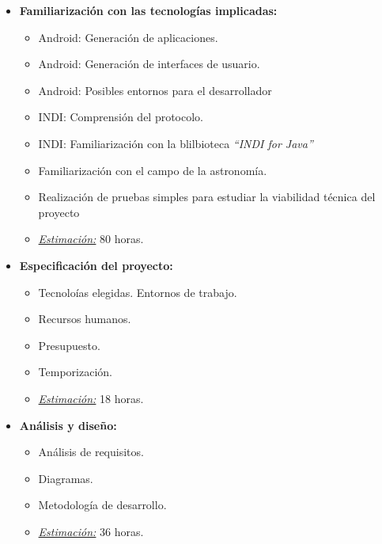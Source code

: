 \begin{itemize}
   \item \textbf{Familiarización con las tecnologías implicadas:}
   \begin{itemize}
    \item Android: Generación de aplicaciones.
    \item Android: Generación de interfaces de usuario.
    \item Android: Posibles entornos para el desarrollador
    \item INDI: Comprensión del protocolo.
    \item INDI: Familiarización con la blilbioteca \textit{``INDI for Java''}
    \item Familiarización con el campo de la astronomía.
    \item Realización de pruebas simples para estudiar la viabilidad técnica del proyecto
    \item \underline{\textit{Estimación:}} 80 horas.
   \end{itemize}
\end{itemize}

\begin{itemize}
   \item \textbf{Especificación del proyecto:}
   \begin{itemize}
    \item Tecnoloías elegidas. Entornos de trabajo.
    \item Recursos humanos.
    \item Presupuesto.
    \item Temporización.
    \item \underline{\textit{Estimación:}} 18 horas.
   \end{itemize}
\end{itemize}

\begin{itemize}
   \item \textbf{Análisis y diseño:}
   \begin{itemize}
    \item Análisis de requisitos.
    \item Diagramas.
    \item Metodología de desarrollo.
    \item \underline{\textit{Estimación:}} 36 horas.
   \end{itemize}
\end{itemize}


